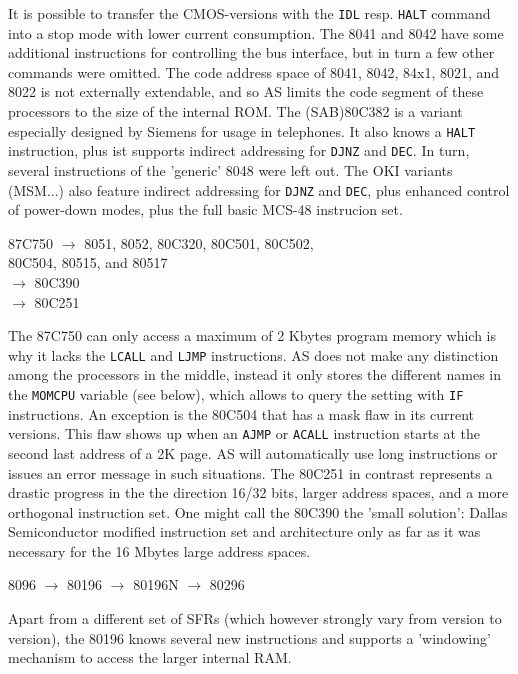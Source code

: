 \documentclass[12pt,twoside]{report}
\newcommand{\tty}[1]{{\tt #1}}
\newcommand{\asname}{{AS}}
\begin{document}
It is possible to transfer the CMOS-versions with the \tty{IDL} resp.
\tty{HALT} command into a stop mode with lower current consumption.
The 8041 and 8042 have some additional instructions for controlling the
bus interface, but in turn a few other commands were omitted.
The code address space of 8041, 8042, 84x1, 8021, and 8022 is not externally
extendable, and so \asname{} limits the code segment of these processors to
the size of the internal ROM.  The (SAB)80C382 is a variant especially
designed by Siemens for usage in telephones.  It also knows a
\tty{HALT} instruction, plus ist supports indirect addressing for
\tty{DJNZ} and \tty{DEC}.  In turn, several instructions of the
'generic' 8048 were left out.  The OKI variants (MSM...) also
feature indirect addressing for \tty{DJNZ} and \tty{DEC}, plus
enhanced control of power-down modes, plus the full basic MCS-48
instrucion set.
\begin{cpulist}
   87C750 $\rightarrow$ 8051, 8052, 80C320, 80C501, 80C502, \\
\> 80C504, 80515, and 80517 \\
\> $\rightarrow$ 80C390 \\
\> $\rightarrow$ 80C251
\end{cpulist}
The 87C750 can only access a maximum of 2 Kbytes program memory which is
why it lacks the \tty{LCALL} and \tty{LJMP} instructions.  \asname{} does not
make any distinction among the processors in the middle, instead it only
stores the different names in the \tty{MOMCPU} variable (see below), which
allows to query the setting with \tty{IF} instructions.  An exception is
the 80C504 that has a mask flaw in its current versions.  This flaw shows
up when an \tty{AJMP} or \tty{ACALL} instruction starts at the second last
address of a 2K page.  \asname{} will automatically use long instructions or
issues an error message in such situations.  The 80C251 in contrast
represents a drastic progress in the the direction 16/32 bits, larger
address spaces, and a more orthogonal instruction set.  One might call the
80C390 the 'small solution': Dallas Semiconductor modified instruction set
and architecture only as far as it was necessary for the 16 Mbytes large
address spaces.
\begin{cpulist}
   8096 $\rightarrow$ 80196 $\rightarrow$ 80196N $\rightarrow$ 80296
\end{cpulist}
Apart from a different set of SFRs (which however strongly vary from
version to version), the 80196 knows several new instructions and
supports a 'windowing' mechanism to access the larger internal RAM.
\end{document}
